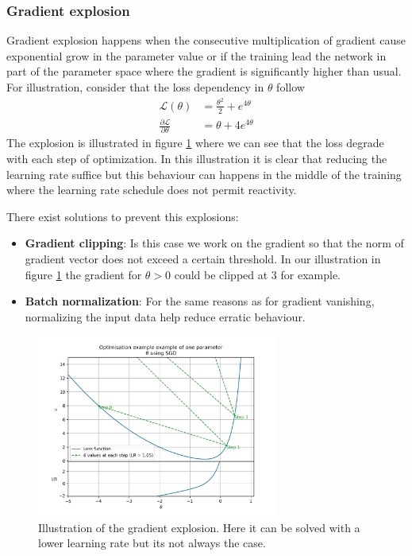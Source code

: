 \documentclass[../main.tex]{subfiles}
\begin{document}
\subsubsection{Gradient explosion}
Gradient explosion happens when the consecutive multiplication of gradient cause exponential grow in the parameter value or if the training lead the network in part of the parameter space where the gradient is significantly higher than usual. For illustration, consider that the loss dependency in $\theta$ follow
\begin{align*}
  \mathcal{L}(\theta) &= \frac{\theta^2}{2} + e^{4\theta} \\
  \frac{\partial \mathcal{L}}{\partial \theta} &= \theta + 4e^{4\theta}
\end{align*}
The explosion is illustrated in figure \ref{fig:ml:explosion} where we can see that the loss degrade with each step of optimization. In this illustration it is clear that reducing the learning rate suffice but this behaviour can happens in the middle of the training where the learning rate schedule does not permit reactivity.

There exist solutions to prevent this explosions:
\begin{itemize}
  \item \textbf{Gradient clipping}: Is this case we work on the gradient so that the norm of gradient vector does not exceed a certain threshold. In our illustration in figure \ref{fig:ml:explosion} the gradient for $\theta > 0$ could be clipped at 3 for example.
  \item \textbf{Batch normalization}: For the same reasons as for gradient vanishing, normalizing the input data help reduce erratic behaviour.
\end{itemize}


\begin{figure}[ht]
  \centering
  \includegraphics[height=6cm]{scripts/plots/MSE_explosion_illustration.png}
  \caption{Illustration of the gradient explosion. Here it can be solved with a lower learning rate but its not always the case.}
  \label{fig:ml:explosion}
\end{figure}
\end{document}
